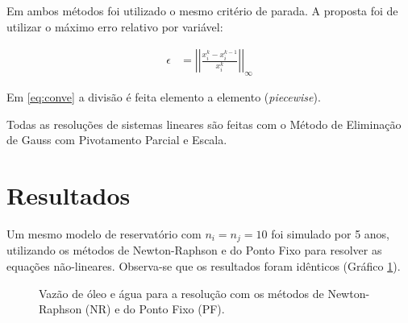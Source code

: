 \documentclass[final,5p]{elsarticle}
\numberwithin{equation}{section}
\begin{document}
        Em ambos métodos foi utilizado o mesmo critério de parada. A proposta foi de utilizar o máximo erro relativo por variável:

        \begin{align}
            \epsilon &= \left|\left|\frac{x_i^k - x_i^{k-1}}{x_i^k}\right|\right|_\infty \label{eq:conve}
        \end{align}

        Em \ref{eq:conve} a divisão é feita elemento a elemento (\emph{piecewise}).

        Todas as resoluções de sistemas lineares são feitas com o Método de Eliminação de Gauss com Pivotamento Parcial e Escala\cite{relatoriogauss}.

\section{Resultados}

        Um mesmo modelo de reservatório com $n_i=n_j=10$ foi simulado por 5 anos, utilizando os métodos de Newton-Raphson e do Ponto Fixo para resolver as equações não-lineares. Observa-se que os resultados foram idênticos (Gráfico \ref{fig:vazao}).

        \begin{figure}[hbt!]
            \caption{Vazão de óleo e água para a resolução com os métodos de Newton-Raphson (NR) e do Ponto Fixo (PF).}
            \label{fig:vazao}
        \end{figure}
\end{document}
